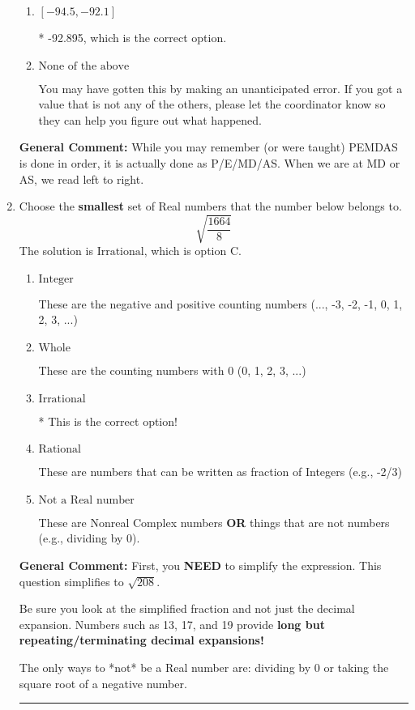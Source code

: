 \documentclass{extbook}[14pt]
\newcommand{\litem}[1]{\item #1

\rule{\textwidth}{0.4pt}}
\begin{document}
\begin{enumerate}
{\begin{enumerate}[label=\Alph*.]
 -91.474, which corresponds to an Order of Operations error: not reading left-to-right for multiplication/division.
\item \( [-94.5, -92.1] \)

* -92.895, which is the correct option.
\item \( \text{None of the above} \)

 You may have gotten this by making an unanticipated error. If you got a value that is not any of the others, please let the coordinator know so they can help you figure out what happened.
\end{enumerate}

\textbf{General Comment:} While you may remember (or were taught) PEMDAS is done in order, it is actually done as P/E/MD/AS. When we are at MD or AS, we read left to right.
}
\litem{
Choose the \textbf{smallest} set of Real numbers that the number below belongs to.
\[ \sqrt{\frac{1664}{8}} \]
The solution is \( \text{Irrational} \), which is option C.\begin{enumerate}[label=\Alph*.]
\item \( \text{Integer} \)

These are the negative and positive counting numbers (..., -3, -2, -1, 0, 1, 2, 3, ...)
\item \( \text{Whole} \)

These are the counting numbers with 0 (0, 1, 2, 3, ...)
\item \( \text{Irrational} \)

* This is the correct option!
\item \( \text{Rational} \)

These are numbers that can be written as fraction of Integers (e.g., -2/3)
\item \( \text{Not a Real number} \)

These are Nonreal Complex numbers \textbf{OR} things that are not numbers (e.g., dividing by 0).
\end{enumerate}

\textbf{General Comment:} First, you \textbf{NEED} to simplify the expression. This question simplifies to $\sqrt{208}$. 
 
 Be sure you look at the simplified fraction and not just the decimal expansion. Numbers such as 13, 17, and 19 provide \textbf{long but repeating/terminating decimal expansions!} 
 
 The only ways to *not* be a Real number are: dividing by 0 or taking the square root of a negative number. 
 
}
\end{enumerate}
\end{document}
